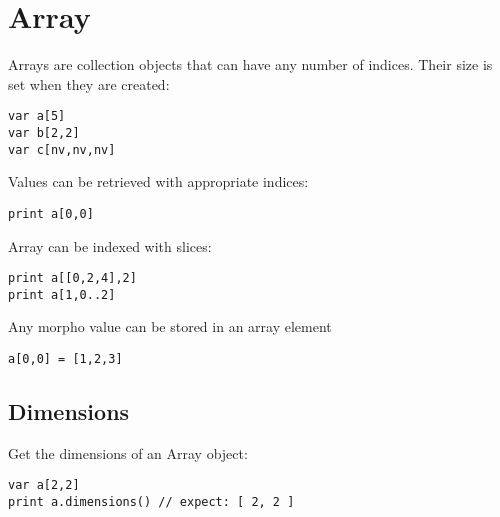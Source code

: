 \hypertarget{array}{%
\section{Array}\label{array}}

Arrays are collection objects that can have any number of indices. Their
size is set when they are created:

\begin{lstlisting}
var a[5]
var b[2,2]
var c[nv,nv,nv]
\end{lstlisting}

Values can be retrieved with appropriate indices:

\begin{lstlisting}
print a[0,0]
\end{lstlisting}

Array can be indexed with slices:

\begin{lstlisting}
print a[[0,2,4],2]
print a[1,0..2]
\end{lstlisting}

Any morpho value can be stored in an array element

\begin{lstlisting}
a[0,0] = [1,2,3]
\end{lstlisting}

\hypertarget{dimensions}{%
\subsection{Dimensions}\label{dimensions}}

Get the dimensions of an Array object:

\begin{lstlisting}
var a[2,2]
print a.dimensions() // expect: [ 2, 2 ]
\end{lstlisting}
